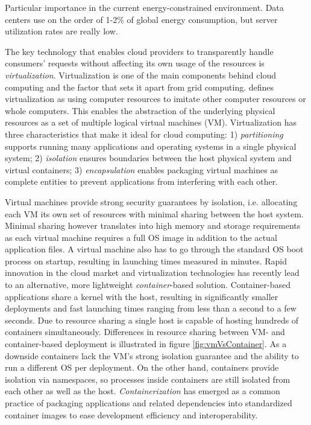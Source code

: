 \documentclass[utf8,english]{gradu3}
\begin{document}
Particular importance in the current energy-constrained environment. Data centers use on the order of 1-2\% of global energy consumption, but server utilization rates are really low. \parencite{horner16powerusage}

The key technology that enables cloud providers to transparently handle consumers' requests without affecting its own usage of the resources is \textit{virtualization}. Virtualization is one of the main components behind cloud computing and the factor that sets it apart from grid computing. \textcite{sareen13cloudTypes} defines virtualization as using computer resources to imitate other computer resources or whole computers. This enables the abstraction of the underlying physical resources as a set of multiple logical virtual machines (VM). Virtualization has three characteristics that make it ideal for cloud computing: 1) \textit{partitioning} supports running many applications and operating systems in a single physical system; 2) \textit{isolation} ensures boundaries between the host physical system and virtual containers; 3) \textit{encapsulation} enables packaging virtual machines as complete entities to prevent applications from interfering with each other.

Virtual machines provide strong security guarantees by isolation, i.e. allocating each VM its own set of resources with minimal sharing between the host system. Minimal sharing however translates into high memory and storage requirements as each virtual machine requires a full OS image in addition to the actual application files. A virtual machine also has to go through the standard OS boot process on startup, resulting in launching times measured in minutes. Rapid innovation in the cloud market and virtualization technologies has recently lead to an alternative, more lightweight \textit{container}-based solution. Container-based applications share a kernel with the host, resulting in significantly smaller deployments and fast launching times ranging from less than a second to a few seconds. Due to resource sharing a single host is capable of hosting hundreds of containers simultaneously. Differences in resource sharing between VM- and container-based deployment is illustrated in figure \ref{fig:vmVsContainer}. As a downside containers lack the VM's strong isolation guarantee and the ability to run a different OS per deployment. On the other hand, containers provide isolation via namespaces, so processes inside containers are still isolated from each other as well as the host. \textit{Containerization} has emerged as a common practice of packaging applications and related dependencies into standardized container images to ease development efficiency and interoperability. \parencite{pahl15containerization}
\end{document}
